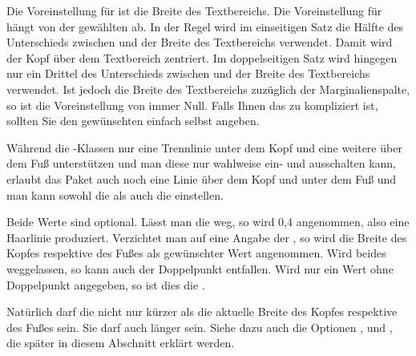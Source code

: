 Die Voreinstellung für  ist die Breite des Textbereichs. Die
Voreinstellung für  hängt von der gewählten 
ab. In der Regel wird im einseitigen Satz die Hälfte des Unterschieds zwischen
 und der Breite des Textbereichs verwendet. Damit wird der Kopf
über dem Textbereich zentriert. Im doppelseitigen Satz wird hingegen nur ein
Drittel des Unterschieds zwischen  und der Breite des
Textbereichs verwendet. Ist  jedoch die Breite des Textbereichs
zuzüglich der Marginalienspalte, so ist die Voreinstellung von 
immer Null. Falls Ihnen das zu kompliziert ist, sollten Sie den gewünschten
 einfach selbst angeben.%
\EndIndexGroup


\begin{Declaration}
\end{Declaration}
%
%
%
%
Während die \KOMAScript-Klassen nur eine Trennlinie unter dem Kopf und eine
weitere über dem Fuß unterstützen und man diese nur wahlweise ein- und
ausschalten kann, erlaubt das Paket  auch noch eine
Linie über dem Kopf und unter dem Fuß und man kann sowohl
die  als auch die  einstellen.

Beide Werte sind optional. Lässt man die  weg, so wird
0,4 angenommen, also eine Haarlinie produziert. Verzichtet man auf
eine Angabe der , so wird die Breite des Kopfes respektive des
Fußes als gewünschter Wert angenommen. Wird beides weggelassen, so kann auch
der Doppelpunkt entfallen. Wird nur ein Wert ohne Doppelpunkt angegeben, so
ist dies die .

Natürlich darf die  nicht nur kürzer als die aktuelle Breite des
Kopfes respektive des Fußes sein. Sie darf auch länger sein. Siehe dazu auch
die Optionen %
,
 und
, die später in diesem
Abschnitt erklärt werden.

